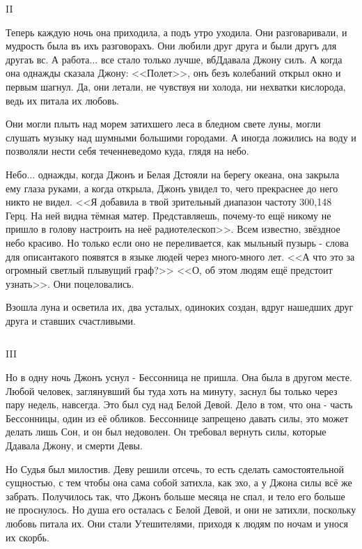 \documentclass{article}
\newcommand{\И}{{\fontencoding{X2}\selectfont\CYRII}} %
\newcommand{\и}{{\fontencoding{X2}\selectfont\cyrii}} %
\newcommand{\Е}{{\fontencoding{X2}\selectfont\CYRYAT}} %
\newcommand{\е}{{\fontencoding{X2}\selectfont\cyryat}} %
\newcommand{\Ф}{{\fontencoding{X2}\selectfont\CYROTLD}} %
\newcommand{\ф}{{\fontencoding{X2}\selectfont\cyrotld}} %
\newcommand{\Ы}{{\fontencoding{X2}\selectfont\CYRIZH}} %
\newcommand{\ы}{{\fontencoding{X2}\selectfont\cyrizh}} %
\begin{document}
\newpage

\begin{center}
II
\end{center}

Теперь каждую ночь она приходила, а подъ утро уходила. Они разговаривали, и мудрость была въ ихъ разговорахъ. Они любили друг друга и были другъ для другаъ вс. А работа$ \ldots $ все стало только лучше, в б Д давала Джону силъ. А когда она однажды сказала Джону: <<Полет>>, онъ безъ колебаний открыл окно и первым шагнул. Да, они летали, не чувствуя ни холода, ни нехватки кислорода, ведь их питала их любовь. 

Они могли плыть над морем затихшего леса в бледном свете луны, могли слушать музыку над шумными большими городами. А иногда ложились на воду и позволяли нести себя течен неведомо куда, глядя на небо. 

Небо$ \ldots $ однажды, когда Джонъ и Белая Д стояли на берегу океана, она закрыла ему глаза руками, а когда открыла, Джонъ увидел то, чего прекраснее до него никто не видел. <<Я добавила в твой зрительный диапазон частоту 300,148 Герц. На ней видна тёмная матер. Представляешь, почему-то ещё никому не пришло в голову настроить на неё радиотелескоп>>. Всем известно, звёздное небо красиво. Но только если оно не переливается, как мыльный пузырь - слова для описан такого появятся в языке людей через много-много лет. <<А что это за огромный светлый плывущий граф?>> <<О, об этом людям ещё предстоит узнать>>. Они поцеловались. 

Взошла луна и осветила их, два усталых, одиноких создан, вдруг нашедших друг друга и ставших счастливыми.

$ $

\begin{center}
III
\end{center}

Но в одну ночь Джонъ уснул - Бессонница не пришла. Она была в другом месте. Любой человек, заглянувший бы туда хоть на минуту, заснул бы только через пару недель, навсегда. Это был суд над Белой Девой. Дело в том, что она - часть Бессонницы, один из её обликов. Бессоннице запрещено давать силы, это может делать лишь Сон, и он был недоволен. Он требовал вернуть силы, которые Д давала Джону, и смерти Девы. 

Но Судья был милостив. Деву решили отсечь, то есть сделать самостоятельной сущностью, с тем чтобы она сама собой затихла, как эхо, а у Джона силы всё же забрать. Получилось так, что Джонъ больше месяца не спал, и тело его больше не проснулось. Но душа его осталась с Белой Девой, и они не затихли, поскольку любовь питала их. Они стали Утешителями, приходя к людям по ночам и унося их скорбь.
\end{document}
